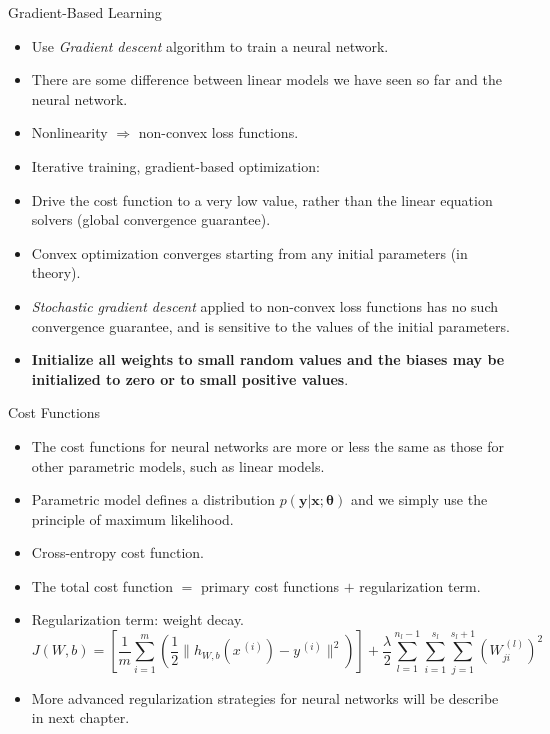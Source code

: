 \documentclass[10pt]{beamer}
\begin{document}
	\begin{frame}{Gradient-Based Learning}
		\begin{itemize}
			\item Use \emph{Gradient descent} algorithm to train a neural network.
			\item There are some difference between linear models we have seen so far and the neural network.
			\item Nonlinearity $\Longrightarrow$ non-convex loss functions.
			\item Iterative training, gradient-based optimization: 
			\item Drive the cost function to a very low value, rather than the linear equation solvers (global convergence guarantee).
			\item Convex optimization converges starting from any initial parameters (in theory).
			\item \emph{Stochastic gradient descent} applied to non-convex loss functions has no such convergence guarantee, and is sensitive to the values of the initial parameters.
			\item \textbf{Initialize all weights to small random values and the biases may be initialized to zero or to small positive values}.
		\end{itemize}
	\end{frame}
	
	\begin{frame}{Cost Functions}
		\begin{itemize}
			\item The cost functions for neural networks are more or less the same as those for other parametric models, such as linear models.
			\item Parametric model defines a distribution $p(\bm{y}|\bm{x};\bm{\theta})$ and we simply use the principle of maximum likelihood.
			\item Cross-entropy cost function.
			\item The total cost function $=$ primary cost functions $+$ regularization term.
			\item Regularization term: weight decay.
			\begin{equation*}
				J(W,b)=\left[\frac{1}{m}\sum_{i=1}^m(\frac{1}{2}\lVert h_{W,b}(x^{\,(i)})-y^{\,(i)}\rVert^2)\right]+\frac{\lambda}{2}\sum_{l=1}^{n_l-1}\sum_{i=1}^{s_l}\sum_{j=1}^{s_l+1}\left(W_{ji}^{\,(l)}\right)^2
			\end{equation*}
			\item More advanced regularization strategies for neural networks will be describe in next chapter.
		\end{itemize}
	\end{frame}
	
\end{document}
